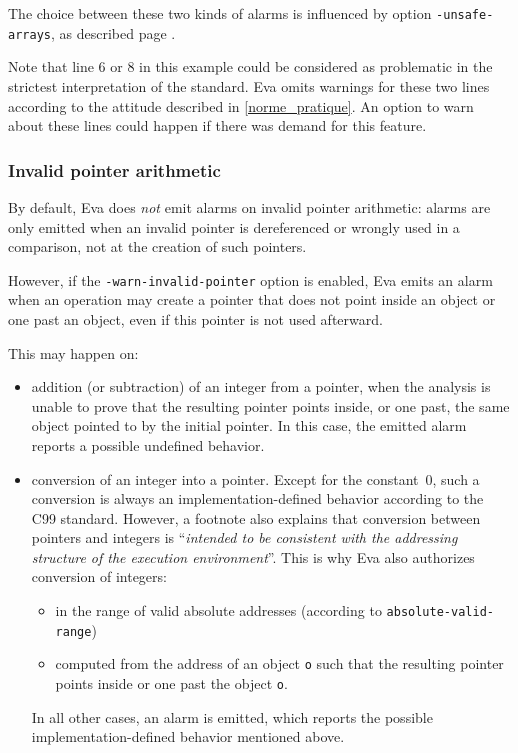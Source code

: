 \documentclass[web]{frama-c-book}
\newcommand{\isoc}{\textsf{C99}}
\newcommand{\Eva}{\textsf{Eva}}
\begin{document}
The choice between these two kinds of alarms is influenced by 
option \lstinline|-unsafe-arrays|, as described
page \pageref{unsafe-arrays}.

Note that line 6 or 8 in this example could be considered as
problematic in the strictest interpretation of the standard.
\Eva{} omits warnings for these two lines according
to the attitude described in \ref{norme_pratique}. An option 
to warn about these lines could happen if there was demand for
this feature.

\subsubsection{Invalid pointer arithmetic}

By default, \Eva{} does \emph{not} emit alarms on invalid pointer arithmetic:
alarms are only emitted when an invalid pointer is dereferenced or wrongly used
in a comparison, not at the creation of such pointers.

However, if the \lstinline|-warn-invalid-pointer| option is enabled,
\Eva{} emits an alarm when an operation may create a pointer that does
not point inside an object or one past an object,
even if this pointer is not used afterward.

This may happen on:
\begin{itemize}
\item addition (or subtraction) of an integer from a pointer, when the analysis
  is unable to prove that the resulting pointer points inside, or one past,
  the same object pointed to by the initial pointer.
  In this case, the emitted alarm reports a possible undefined behavior.
\item conversion of an integer into a pointer. Except for the constant~0,
  such a conversion is always an implementation-defined behavior
  according to the \isoc{} standard. However, a footnote also explains that
  conversion between pointers and integers is ``\emph{intended to
  be consistent with the addressing structure of the execution environment}''.
  This is why Eva also authorizes conversion of integers:
  \begin{itemize}
  \item in the range of valid absolute addresses
    (according to \texttt{absolute-valid-range})
  \item computed from the address of an object \lstinline|o| such that the
    resulting pointer points inside or one past the object \lstinline|o|.
  \end{itemize}
  In all other cases, an alarm is emitted, which reports the possible
  implementation-defined behavior mentioned above.
\end{itemize}
\end{document}
